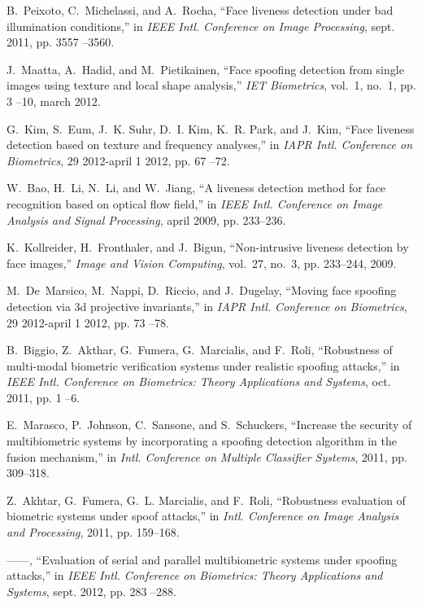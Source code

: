 \documentclass[journal]{IEEEtran}
\begin{document}
\begin{thebibliography}{10}
B.~Peixoto, C.~Michelassi, and A.~Rocha, ``Face liveness detection under bad
  illumination conditions,'' in \emph{IEEE Intl. Conference on Image
  Processing}, sept. 2011, pp. 3557 --3560.

J.~Maatta, A.~Hadid, and M.~Pietikainen, ``Face spoofing detection from single
  images using texture and local shape analysis,'' \emph{IET Biometrics},
  vol.~1, no.~1, pp. 3 --10, march 2012.

G.~Kim, S.~Eum, J.~K. Suhr, D.~I. Kim, K.~R. Park, and J.~Kim, ``Face liveness
  detection based on texture and frequency analyses,'' in \emph{IAPR Intl.
  Conference on Biometrics}, 29 2012-april 1 2012, pp. 67 --72.

W.~Bao, H.~Li, N.~Li, and W.~Jiang, ``A liveness detection method for face
  recognition based on optical flow field,'' in \emph{IEEE Intl. Conference on
  Image Analysis and Signal Processing}, april 2009, pp. 233--236.

K.~Kollreider, H.~Fronthaler, and J.~Bigun, ``Non-intrusive liveness detection
  by face images,'' \emph{Image and Vision Computing}, vol.~27, no.~3, pp.
  233--244, 2009.

M.~De~Marsico, M.~Nappi, D.~Riccio, and J.~Dugelay, ``Moving face spoofing
  detection via 3d projective invariants,'' in \emph{IAPR Intl. Conference on
  Biometrics}, 29 2012-april 1 2012, pp. 73 --78.

B.~Biggio, Z.~Akthar, G.~Fumera, G.~Marcialis, and F.~Roli, ``Robustness of
  multi-modal biometric verification systems under realistic spoofing
  attacks,'' in \emph{IEEE Intl. Conference on Biometrics: Theory Applications
  and Systems}, oct. 2011, pp. 1 --6.

E.~Marasco, P.~Johnson, C.~Sansone, and S.~Schuckers, ``Increase the security
  of multibiometric systems by incorporating a spoofing detection algorithm in
  the fusion mechanism,'' in \emph{Intl. Conference on Multiple Classifier
  Systems}, 2011, pp. 309--318.

Z.~Akhtar, G.~Fumera, G.~L. Marcialis, and F.~Roli, ``Robustness evaluation of
  biometric systems under spoof attacks,'' in \emph{Intl. Conference on Image
  Analysis and Processing}, 2011, pp. 159--168.

------, ``Evaluation of serial and parallel multibiometric systems under
  spoofing attacks,'' in \emph{IEEE Intl. Conference on Biometrics: Theory
  Applications and Systems}, sept. 2012, pp. 283 --288.


\end{thebibliography}
\end{document}
